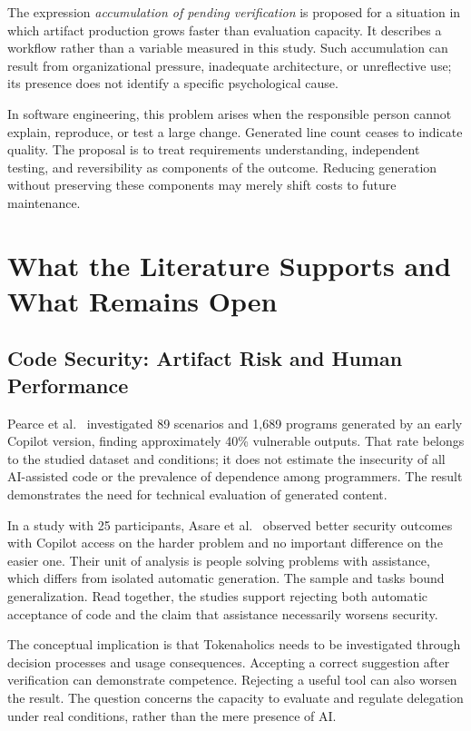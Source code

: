 \documentclass[11pt,a4paper]{article}
\begin{document}
The expression \textit{accumulation of pending verification} is proposed for a situation in which artifact production grows faster than evaluation capacity. It describes a workflow rather than a variable measured in this study. Such accumulation can result from organizational pressure, inadequate architecture, or unreflective use; its presence does not identify a specific psychological cause.

In software engineering, this problem arises when the responsible person cannot explain, reproduce, or test a large change. Generated line count ceases to indicate quality. The proposal is to treat requirements understanding, independent testing, and reversibility as components of the outcome. Reducing generation without preserving these components may merely shift costs to future maintenance.

\section{What the Literature Supports and What Remains Open}
\subsection{Code Security: Artifact Risk and Human Performance}
Pearce et al.\ \cite{pearce} investigated 89 scenarios and 1,689 programs generated by an early Copilot version, finding approximately 40\% vulnerable outputs. That rate belongs to the studied dataset and conditions; it does not estimate the insecurity of all AI-assisted code or the prevalence of dependence among programmers. The result demonstrates the need for technical evaluation of generated content.

In a study with 25 participants, Asare et al.\ \cite{asare} observed better security outcomes with Copilot access on the harder problem and no important difference on the easier one. Their unit of analysis is people solving problems with assistance, which differs from isolated automatic generation. The sample and tasks bound generalization. Read together, the studies support rejecting both automatic acceptance of code and the claim that assistance necessarily worsens security.

The conceptual implication is that Tokenaholics needs to be investigated through decision processes and usage consequences. Accepting a correct suggestion after verification can demonstrate competence. Rejecting a useful tool can also worsen the result. The question concerns the capacity to evaluate and regulate delegation under real conditions, rather than the mere presence of AI.
\end{document}
